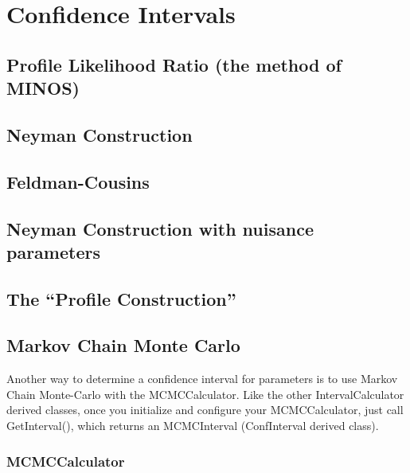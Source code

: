 \documentclass[11pt]{article}
\begin{document}
\section{Confidence Intervals}

	\subsection{Profile Likelihood Ratio (the method of MINOS)}

	\subsection{Neyman Construction}

	\subsection{Feldman-Cousins}

	\subsection{Neyman Construction with nuisance parameters}

	\subsection{The ``Profile Construction''}

	\subsection{Markov Chain Monte Carlo}

	Another way to determine a confidence interval for parameters is to use Markov Chain Monte-Carlo with the MCMCCalculator.  Like the other IntervalCalculator derived classes, once you initialize and configure your MCMCCalculator, just call GetInterval(), which returns an MCMCInterval (ConfInterval derived class).
	
	\subsubsection{MCMCCalculator}
	\label{sec:MCMCCalculator}
	
\end{document}
